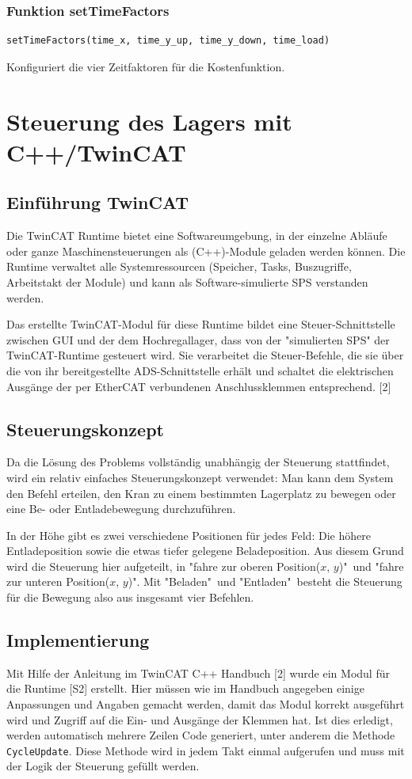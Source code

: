 \documentclass{fh-ium-bama}
\begin{document}
\subsection{Funktion setTimeFactors}
\begin{lstlisting}
setTimeFactors(time_x, time_y_up, time_y_down, time_load)
\end{lstlisting}
Konfiguriert die vier Zeitfaktoren für die Kostenfunktion.

\newpage
\chapter{Steuerung des Lagers mit C++/TwinCAT}
\section{Einführung TwinCAT}
Die TwinCAT Runtime bietet eine Softwareumgebung, in der einzelne Abläufe oder ganze Maschinensteuerungen als (C++)-Module geladen werden können. Die Runtime verwaltet alle Systemressourcen (Speicher, Tasks, Buszugriffe, Arbeitstakt der Module) und kann als Software-simulierte SPS verstanden werden.

Das erstellte TwinCAT-Modul für diese Runtime bildet eine Steuer-Schnittstelle zwischen GUI und der dem Hochregallager, dass von der "simulierten SPS" der TwinCAT-Runtime gesteuert wird. Sie verarbeitet die Steuer-Befehle, die sie über die von ihr bereitgestellte ADS-Schnittstelle erhält und schaltet die elektrischen Ausgänge der per EtherCAT verbundenen Anschlussklemmen entsprechend. [2]

\section{Steuerungskonzept}
Da die Lösung des Problems vollständig unabhängig der Steuerung stattfindet, wird ein relativ einfaches Steuerungskonzept verwendet: Man kann dem System den Befehl erteilen, den Kran zu einem bestimmten Lagerplatz zu bewegen oder eine Be- oder Entladebewegung durchzuführen.

In der Höhe gibt es zwei verschiedene Positionen für jedes Feld: Die höhere Entladeposition sowie die etwas tiefer gelegene Beladeposition. Aus diesem Grund wird die Steuerung hier aufgeteilt, in "fahre zur oberen Position($x$, $y$)"\ und "fahre zur unteren Position($x$, $y$)". Mit "Beladen"\ und "Entladen"\ besteht die Steuerung für die Bewegung also aus insgesamt vier Befehlen.

\section{Implementierung}
Mit Hilfe der Anleitung im TwinCAT C++ Handbuch [2] wurde ein Modul für die Runtime [S2] erstellt. Hier müssen wie im Handbuch angegeben einige Anpassungen und Angaben gemacht werden, damit das Modul korrekt ausgeführt wird und Zugriff auf die Ein- und Ausgänge der Klemmen hat.
Ist dies erledigt, werden automatisch mehrere Zeilen Code generiert, unter anderem die Methode \lstinline|CycleUpdate|. Diese Methode wird in jedem Takt einmal aufgerufen und muss mit der Logik der Steuerung gefüllt werden.
\end{document}
